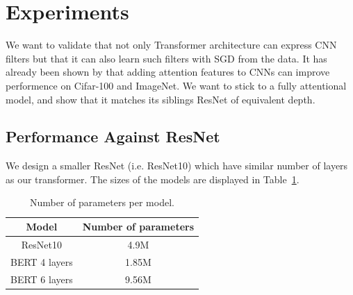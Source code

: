 \documentclass{article} %
\begin{document}
\section{Experiments}
\label{sec:experiments}

We want to validate that not only Transformer architecture can express CNN filters
but that it can also learn such filters with SGD from the data.
%
It has already been shown by \citep{belloAttentionAugmentedConvolutional2019} that 
adding attention features to CNNs can improve performence on Cifar-100 and ImageNet.
%
We want to stick to a fully attentional model, and show that it matches its siblings ResNet of equivalent depth.

\subsection{Performance Against ResNet}

We design a smaller ResNet (i.e. ResNet10) which have similar number of layers as our transformer.
The sizes of the models are displayed in Table~\ref{tab:parameter_size}. 

\begin{table}
  \centering
  \begin{tabular}{cc}
    \toprule
    Model & Number of parameters\\
    \midrule
    ResNet10 & 4.9M\\
    BERT 4 layers & 1.85M\\
    BERT 6 layers & 9.56M \\
    \bottomrule
  \end{tabular}
  \caption{Number of parameters per model.}
  \label{tab:parameter_size}
\end{table}
\end{document}
